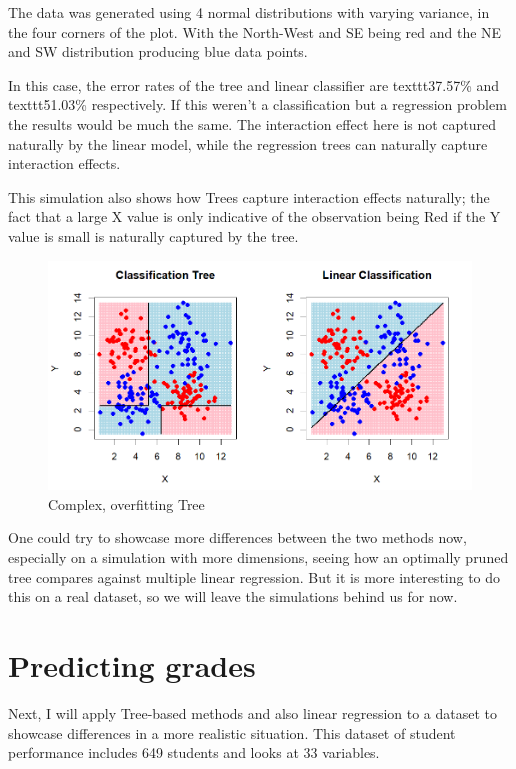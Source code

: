 \documentclass[12pt]{article}
\begin{document}
The data was generated using 4 normal distributions with varying variance, in the four corners of the plot. With the North-West and SE being red and the NE and SW distribution producing blue data points.

In this case, the error rates of the tree and linear classifier are texttt{37.57\%} and texttt{51.03\%} respectively. If this weren't a classification but a regression problem the results would be much the same. The interaction effect here is not captured naturally by the linear model, while the regression trees can naturally capture interaction effects.

This simulation also shows how Trees capture interaction effects naturally; the fact that a large X value is only indicative of the observation being Red if the Y value is small is naturally captured by the tree.

\begin{figure}
    \centering
    \includegraphics[scale=0.30]{NLD Pred.png}
    \caption{Complex, overfitting Tree}
\end{figure}

One could try to showcase more differences between the two methods now, especially on a simulation with more dimensions, seeing how an optimally pruned tree compares against multiple linear regression. But it is more interesting to do this on a real dataset, so we will leave the simulations behind us for now.


\section{Predicting grades}

Next, I will apply Tree-based methods and also linear regression to a dataset to showcase differences in a more realistic situation. This dataset of student performance includes 649 students and looks at 33 variables.
\end{document}
